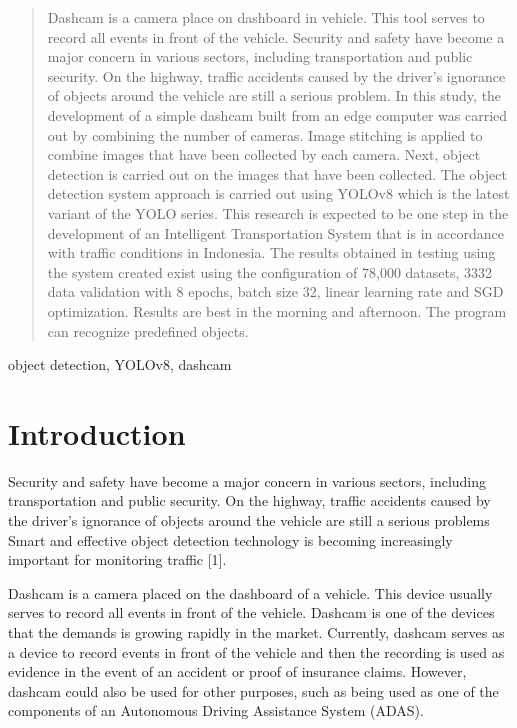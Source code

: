 \documentclass[conference]{IEEEtran}
\begin{document}
\begin{abstract}
Dashcam is a camera place on dashboard  in vehicle. This tool serves to record all events in front of the vehicle. 
Security and safety have become a major concern in various sectors, including transportation and public security. 
On the highway, traffic accidents caused by the driver's ignorance of objects around the vehicle are still a serious problem. 
In this study, the development of a simple dashcam built from an edge computer was carried out by combining the number of cameras. Image stitching is applied to combine images that have been collected by each camera.  
Next, object detection is carried out on the images that have been collected. The object detection system approach is carried out using YOLOv8 which is the latest variant of the YOLO series. This research is expected to be one step in the development of an Intelligent Transportation System that is in accordance with traffic conditions in Indonesia.
The results obtained in testing using the system created exist using the configuration of 78,000 datasets, 3332 data validation with 8 epochs, batch size 32, linear learning rate and SGD optimization. Results are best in the morning and afternoon. The program can recognize predefined objects. 
\end{abstract}

\begin{IEEEkeywords}
object detection, YOLOv8, dashcam
\end{IEEEkeywords}

\section{Introduction}
Security and safety have become a major concern in various sectors, including transportation and public security. On the highway, traffic accidents caused by the driver's ignorance of objects around the vehicle are still a serious problems
Smart and effective object detection technology is becoming increasingly important for monitoring traffic [1].

Dashcam is a camera placed on the dashboard of a vehicle. This device usually serves to record all events in front of the vehicle.
Dashcam is one of the devices that the demands is growing rapidly in the market. Currently, dashcam serves as a device to record events in front of the vehicle and then the recording is used as evidence in the event of an accident or proof of insurance claims. 
However, dashcam could also be used for other purposes, such as being used as one of the components of an Autonomous Driving Assistance System (ADAS). 
\end{document}
